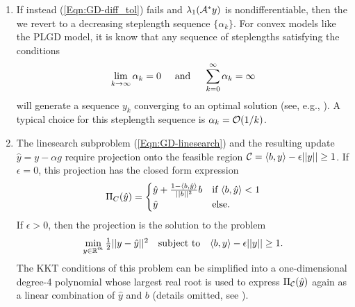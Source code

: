 \begin{enumerate}
\item
If instead (\ref{Eqn:GD-diff_tol}) fails and $\lambda_1({\mathcal A}^* y)$ is nondifferentiable, then the we revert to a decreasing steplength sequence $\{ \alpha_k \}$.  For convex models like the PLGD model, it is know that any sequence of steplengths satisfying the conditions
\begin{equation} 		\label{Eqn:GD-steplength_sum}
	\lim\limits_{\substack{k \rightarrow \infty}} \alpha_k = 0
	\hspace{.5cm} \textnormal{and} \hspace{.5cm}
	\sum\limits_{\substack{k = 0}}^{\substack{\infty}} \alpha_k = \infty
\end{equation}
will generate a sequence $y_k$ converging to an optimal solution (see, e.g., \cite[Proposition 1.2.3 and Section 3.3.1]{bertsekas2016nonlinear}).  A typical choice for this steplength sequence is $\alpha_k = {\mathcal O}(1/k)$.



\item

The linesearch subproblem (\ref{Eqn:GD-linesearch}) and the resulting update $\hat{y} = y - \alpha g$ require projection onto the feasible region ${\mathcal C}= \langle b, y \rangle - \epsilon ||y|| \geq 1$.   If $\epsilon = 0$, this projection has the closed form expression
\begin{equation} 	\label{Eqn:GD-projection}
\Pi_C(\hat{y}) =
	\begin{cases}
		\hat{y} + \frac{1 - \langle b, \hat{y} \rangle}{||b||^2}b 	&	\textnormal{if} \ \langle b, \hat{y} \rangle < 1		\\
		\hat{y}													& \textnormal{else}.
	\end{cases}
\end{equation}
If $\epsilon > 0$, then the projection is the solution to the problem
\begin{equation}		\label{Eqn:GD-projection_2}
\begin{array}{lcr}
\min\limits_{\substack{ y \in \mathbb{R}^m}} \frac{1}{2} || y - \hat{y} ||^2
	&	\textnormal{subject to} 	&	 \langle b, y \rangle - \epsilon ||y|| \geq 1.
\end{array}
\end{equation}
The KKT conditions of this problem can be simplified into a one-dimensional degree-4 polynomial whose largest real root is used to express $\Pi_{\mathcal C}(\hat{y})$ again as a linear combination of $\hat{y}$ and $b$ (details omitted, see \cite[Chapter 5]{boyd2004convex}).






\end{enumerate}
